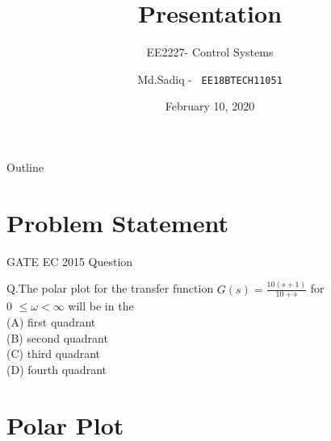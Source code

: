 \documentclass{beamer}
\title{Presentation}
\subtitle{EE2227- Control Systems}
\author{
Md.Sadiq -  \
\texttt{EE18BTECH11051}
}
\institute{IIT HYDERABAD}
\date{February 10, 2020}
\begin{document}
\begin{frame}
  \titlepage
\end{frame}

\begin{frame}{Outline}
  \tableofcontents
\end{frame}

\section{Problem Statement}

\begin{frame}{GATE EC 2015 Question}
 
 
   Q.The polar plot for the transfer function $ G(s) = \frac{10(s+1)}{10+s}$ for \\0 $\leq \omega < \infty$ will be in the \\
  (A) first quadrant\\
  (B) second quadrant\\
  (C) third quadrant\\
  (D) fourth quadrant\\
\end{frame}

\section{Polar Plot}
\end{document}
